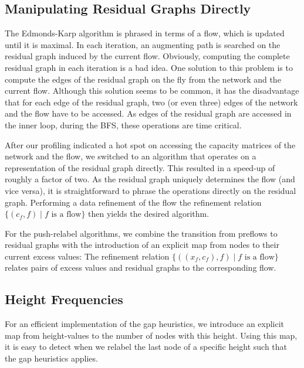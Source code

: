 \documentclass[smallcondensed]{svjour3}     %
\begin{document}
  \subsection{Manipulating Residual Graphs Directly}\label{sec:impl_res_graph}
  The Edmonds-Karp algorithm is phrased in terms of a flow, which is updated until it is maximal. 
  In each iteration, an augmenting path is searched on the residual graph induced by the current flow.
  Obviously, computing the complete residual graph in each iteration is a bad idea. 
  One solution to this problem is to compute the edges of the residual graph on the fly from the network and the current flow.
  Although this solution seems to be common, it has the disadvantage that for each edge of the residual graph, two (or even three) 
  edges of the network and the flow have to be accessed. As edges of the residual graph are accessed in the inner loop, during 
  the BFS, these operations are time critical.
  
  After our profiling indicated a hot spot on accessing the capacity matrices of the network and the flow, we switched to 
  an algorithm that operates on a representation of the residual graph directly. This resulted in a speed-up of roughly a factor of two.
  As the residual graph uniquely determines the flow (and vice versa), it is straightforward to phrase the
  operations directly on the residual graph. Performing a data refinement of the flow \wrt the refinement 
  relation $\{(c_f,f) \mid \text{$f$ is a flow}\}$ then yields the desired algorithm. 

  For the push-relabel algorithms, we combine the transition from preflows to residual graphs with the introduction of an 
  explicit map from nodes to their current excess values: The refinement relation $\{((x_f,c_f),f) \mid \text{$f$ is a flow}\}$
  relates pairs of excess values and residual graphs to the corresponding flow.
  
  \subsection{Height Frequencies}
  For an efficient implementation of the gap heuristics, we introduce an explicit map from height-values to the number of nodes with this height.
  Using this map, it is easy to detect when we relabel the last node of a specific height such that the gap heuristics applies.
  
\end{document}
